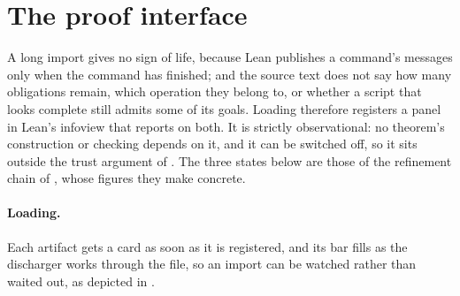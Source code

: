 \section{The proof interface}
\label{sec:barrel-interface}

A long import gives no sign of life, because Lean publishes a command's messages only when
the command has finished; and the source text does not say how many obligations remain,
which operation they belong to, or whether a script that looks complete still admits some of
its goals.
Loading \barrel{} therefore registers a panel in Lean's infoview that reports on both.
It is strictly observational: no theorem's construction or checking depends on it, and it
can be switched off, so it sits outside the trust argument of
.
The three states below are those of the refinement chain of , whose
figures they make concrete.


\paragraph*{Loading.}
Each artifact gets a card as soon as it is registered, and its bar fills as the discharger
works through the file, so an import can be watched rather than waited out, as depicted in .

